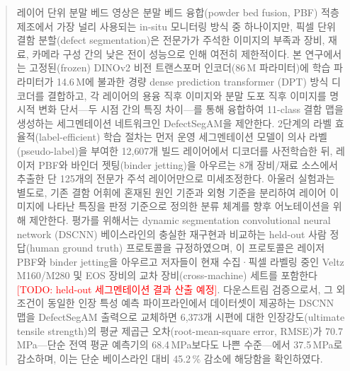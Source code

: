 \documentclass[preprint,12pt]{elsarticle}
\newcommand{\TODO}[1]{\textcolor{red}{[TODO: #1]}}
\begin{document}
\begin{frontmatter}
\begin{abstract}
레이어 단위 분말 베드 영상은 분말 베드 융합(powder bed fusion, PBF)
적층제조에서 가장 널리 사용되는 in-situ 모니터링 방식 중 하나이지만,
픽셀 단위 결함 분할(defect segmentation)은 전문가가 주석한 이미지의
부족과 장비, 재료, 카메라 구성 간의 낮은 전이 성능으로 인해 여전히
제한적이다. 본 연구에서는 고정된(frozen) DINOv2 비전 트랜스포머
인코더(86\,M 파라미터)에 학습 파라미터가 14.6\,M에 불과한 경량
dense prediction transformer (DPT) 방식 디코더를 결합하고, 각 레이어의
용융 직후 이미지와 분말 도포 직후 이미지를 명시적 변화 단서---두 시점
간의 특징 차이---를 통해 융합하여 11-class 결함 맵을 생성하는
세그멘테이션 네트워크인 DefectSegAM을 제안한다. 2단계의 라벨
효율적(label-efficient) 학습 절차는 먼저 운영 세그멘테이션 모델이 의사
라벨(pseudo-label)을 부여한 12{,}607개 빌드 레이어에서 디코더를
사전학습한 뒤, 레이저 PBF와 바인더 젯팅(binder jetting)을 아우르는 8개
장비/재료 소스에서 추출한 단 125개의 전문가 주석 레이어만으로
미세조정한다. 아울러 실험과는 별도로, 기존 결함 어휘에 혼재된 원인
기준과 외형 기준을 분리하여 레이어 이미지에 나타난 특징을 판정 기준으로
정의한 분류 체계를 향후 어노테이션을 위해 제안한다. 평가를
위해서는 dynamic segmentation convolutional
neural network (DSCNN) 베이스라인의 충실한 재구현과 비교하는 held-out
사람
정답(human ground truth) 프로토콜을 규정하였으며, 이 프로토콜은 레이저
PBF와 binder jetting을 아우르고 저자들이 현재 수집·픽셀 라벨링 중인
Veltz M160/M280 및 EOS 장비의 교차 장비(cross-machine) 세트를
포함한다 \TODO{held-out 세그멘테이션 결과 산출 예정}. 다운스트림
검증으로서, 그 외 조건이 동일한 인장 특성 예측 파이프라인에서
데이터셋이 제공하는 DSCNN 맵을 DefectSegAM 출력으로 교체하면
6{,}373개 시편에 대한 인장강도(ultimate tensile strength)의 평균 제곱근
오차(root-mean-square error, RMSE)가 70.7\,MPa---단순 전역 평균 예측기의
68.4\,MPa보다도 나쁜 수준---에서 37.5\,MPa로 감소하며, 이는 단순
베이스라인 대비 45.2\,\% 감소에 해당함을 확인하였다.
\end{abstract}


\end{frontmatter}
\end{document}
